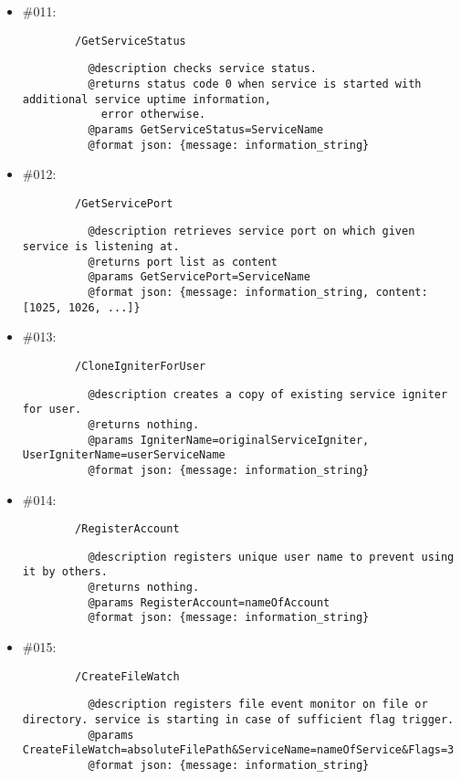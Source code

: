 \documentclass[11pt,a4paper]{scrartcl}
\begin{document}
\begin{description}
\begin{itemize}
        \item \#011:
          \begin{verbatim}
        /GetServiceStatus
          \end{verbatim}
          \begin{verbatim}
          @description checks service status.
          @returns status code 0 when service is started with additional service uptime information,
            error otherwise.
          @params GetServiceStatus=ServiceName
          @format json: {message: information_string}
          \end{verbatim}

        \item \#012:
          \begin{verbatim}
        /GetServicePort
          \end{verbatim}
          \begin{verbatim}
          @description retrieves service port on which given service is listening at.
          @returns port list as content
          @params GetServicePort=ServiceName
          @format json: {message: information_string, content: [1025, 1026, ...]}
          \end{verbatim}

        \item \#013:
          \begin{verbatim}
        /CloneIgniterForUser
          \end{verbatim}
          \begin{verbatim}
          @description creates a copy of existing service igniter for user.
          @returns nothing.
          @params IgniterName=originalServiceIgniter, UserIgniterName=userServiceName
          @format json: {message: information_string}
          \end{verbatim}

        \item \#014:
          \begin{verbatim}
        /RegisterAccount
          \end{verbatim}
          \begin{verbatim}
          @description registers unique user name to prevent using it by others.
          @returns nothing.
          @params RegisterAccount=nameOfAccount
          @format json: {message: information_string}
          \end{verbatim}

        \item \#015:
          \begin{verbatim}
        /CreateFileWatch
          \end{verbatim}
          \begin{verbatim}
          @description registers file event monitor on file or directory. service is starting in case of sufficient flag trigger.
          @params CreateFileWatch=absoluteFilePath&ServiceName=nameOfService&Flags=3
          @format json: {message: information_string}
          \end{verbatim}


\end{itemize}
\end{description}
\end{document}
